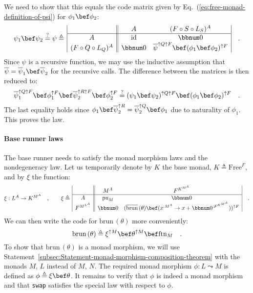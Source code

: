 We need to show that this equals the code matrix given by Eq.~(\ref{eq:free-monad-definition-of-psi})
for $\phi_{1}\bef\phi_{2}$:
\[
\psi_{1}\bef\psi_{2}\overset{?}{=}\psi\triangleq\,\begin{array}{|c||cc|}
 & A & (F\circ S\circ L_{S})^{A}\\
\hline A & \text{id} & \bbnum 0\\
(F\circ Q\circ L_{Q})^{A} & \bbnum 0 & \overline{\psi}^{\uparrow Q\uparrow F}\bef(\phi_{1}\bef\phi_{2})^{\uparrow F}
\end{array}\quad.
\]
Since $\psi$ is a recursive function, we may use the inductive assumption
that $\overline{\psi}=\overline{\psi}_{1}\bef\overline{\psi}_{2}$
for the recursive calls. The difference between the matrices is then
reduced to:
\[
\overline{\psi}_{1}^{\uparrow Q\uparrow F}\bef\phi_{1}^{\uparrow F}\bef\overline{\psi}_{2}^{\uparrow R\uparrow F}\bef\phi_{2}^{\uparrow F}\overset{?}{=}(\psi_{1}\bef\psi_{2})^{\uparrow Q\uparrow F}\bef(\phi_{1}\bef\phi_{2})^{\uparrow F}\quad.
\]
The last equality holds since $\phi_{1}\bef\overline{\psi}_{2}^{\uparrow R}=\overline{\psi}_{2}^{\uparrow Q}\bef\phi_{1}$
due to naturality of $\phi_{1}$. This proves the law.

\paragraph{Base runner laws}

The base runner needs to satisfy the monad morphism laws and the nondegeneracy
law. Let us temporarily denote by $K$ the base monad, $K\triangleq\text{Free}^{F}$,
and by $\xi$ the function:
\[
\xi:L^{A}\rightarrow K^{M^{A}}\quad,\quad\quad\xi\triangleq\,\begin{array}{|c||cc|}
 & M^{A} & F^{K^{M^{A}}}\\
\hline A & \text{pu}_{M} & \bbnum 0\\
F^{M^{L^{A}}} & \bbnum 0 & (\overline{\text{brun}}\,(\theta)\bef(x^{:M^{A}}\rightarrow x+\bbnum 0^{:F^{K^{M^{A}}}}))^{\uparrow F}
\end{array}\quad.
\]
We can then write the code for $\text{brun}\,(\theta)$ more conveniently:
\[
\text{brun}\,(\theta)\triangleq\xi^{\uparrow M}\bef\theta^{\uparrow M}\bef\text{ftn}_{M}\quad.
\]
To show that $\text{brun}\,(\theta)$ is a monad morphism, we will
use Statement~\ref{subsec:Statement-monad-morphism-composition-theorem}
with the monads $M$, $L$ instead of $M$, $N$. The required monad
morphism $\phi:L\leadsto M$ is defined as $\phi\triangleq\xi\bef\theta$.
It remains to verify that $\phi$ is indeed a monad morphism and that
\lstinline!swap! satisfies the special law with respect to $\phi$.

